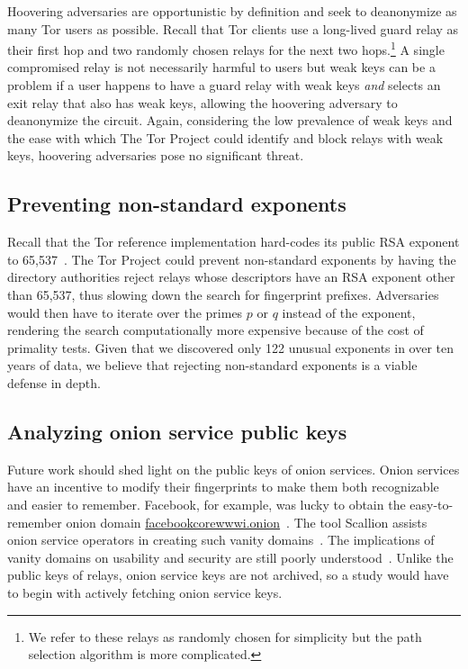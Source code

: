 Hoovering adversaries are opportunistic by definition and seek to deanonymize as
many Tor users as possible.  Recall that Tor clients use a long-lived guard
relay as their first hop and two randomly chosen relays for the next two
hops.\footnote{We refer to these relays as randomly chosen for simplicity but
the path selection algorithm is more complicated.}  A single compromised relay
is not necessarily harmful to users but weak keys can be a problem if a user
happens to have a guard relay with weak keys \emph{and} selects an exit relay
that also has weak keys, allowing the hoovering adversary to deanonymize the
circuit.  Again, considering the low prevalence of weak keys and the ease with
which The Tor Project could identify and block relays with weak keys, hoovering
adversaries pose no significant threat.

\subsection{Preventing non-standard exponents}
Recall that the Tor reference implementation hard-codes its public RSA exponent
to 65,537~\cite[\S~0.3]{torspec}.  The Tor Project could prevent non-standard
exponents by having the directory authorities reject relays whose descriptors
have an RSA exponent other than 65,537, thus slowing down the search for
fingerprint prefixes.  Adversaries would then have to iterate over the primes
$p$ or $q$ instead of the exponent, rendering the search computationally
more expensive because of the cost of primality tests.  Given that we discovered
only 122 unusual exponents in over ten years of data, we believe that rejecting
non-standard exponents is a viable defense in depth.

\subsection{Analyzing onion service public keys}
Future work should shed light on the public keys of onion services.  Onion
services have an incentive to modify their fingerprints to make them both
recognizable and easier to remember.  Facebook, for example, was lucky to
obtain the easy-to-remember onion domain
\url{facebookcorewwwi.onion}~\cite{facebook}.  The tool Scallion assists onion
service operators in creating such vanity domains~\cite{scallion}.  The
implications of vanity domains on usability and security are still poorly
understood~\cite{vanity-domains}.  Unlike the public keys of relays, onion
service keys are not archived, so a study would have to begin with actively
fetching onion service keys.

